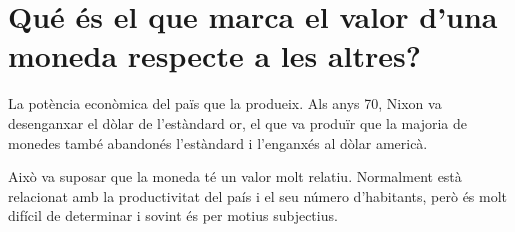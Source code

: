 \section {
  Qué és el que marca el valor d’una moneda respecte a les altres?
}

La potència econòmica del païs que la produeix. Als anys 70, Nixon
va desenganxar el dòlar de l'estàndard or, el que va produïr que la majoria
de monedes també abandonés l'estàndard i l'enganxés al dòlar americà.

Això va suposar que la moneda té un valor molt relatiu. Normalment està
relacionat amb la productivitat del país i el seu número d'habitants, però
és molt difícil de determinar i sovint és per motius subjectius.

